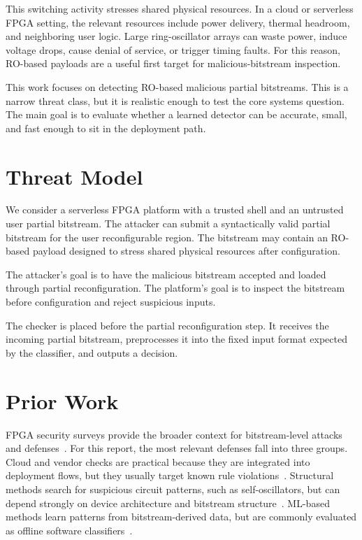This switching activity stresses shared physical resources. In a cloud or serverless FPGA setting, the relevant resources include power delivery, thermal headroom, and neighboring user logic. Large ring-oscillator arrays can waste power, induce voltage drops, cause denial of service, or trigger timing faults. For this reason, RO-based payloads are a useful first target for malicious-bitstream inspection.

This work focuses on detecting RO-based malicious partial bitstreams. This is a narrow threat class, but it is realistic enough to test the core systems question. The main goal is to evaluate whether a learned detector can be accurate, small, and fast enough to sit in the deployment path.

\section{Threat Model}
\label{sec:threat-model}

We consider a serverless FPGA platform with a trusted shell and an untrusted user partial bitstream. The attacker can submit a syntactically valid partial bitstream for the user reconfigurable region. The bitstream may contain an RO-based payload designed to stress shared physical resources after configuration.

The attacker's goal is to have the malicious bitstream accepted and loaded through partial reconfiguration. The platform's goal is to inspect the bitstream before configuration and reject suspicious inputs.

The checker is placed before the partial reconfiguration step. It receives the incoming partial bitstream, preprocesses it into the fixed input format expected by the classifier, and outputs a decision.

\section{Prior Work}
\label{sec:prior-work}

FPGA security surveys provide the broader context for bitstream-level attacks and defenses~\cite{jin2020security,zhang2019recent}. For this report, the most relevant defenses fall into three groups. Cloud and vendor checks are practical because they are integrated into deployment flows, but they usually target known rule violations~\cite{giechaskiel2019measuring,la2021denial}. Structural methods search for suspicious circuit patterns, such as self-oscillators, but can depend strongly on device architecture and bitstream structure~\cite{la2020fpgadefender,provelengios2020power,yoon2018bret}. ML-based methods learn patterns from bitstream-derived data, but are commonly evaluated as offline software classifiers~\cite{rettkowski2019inspection,chaudhuri2022detection,elnaggar2023learning,palumbo2022trojan,stahlesmith2025realtime}.

